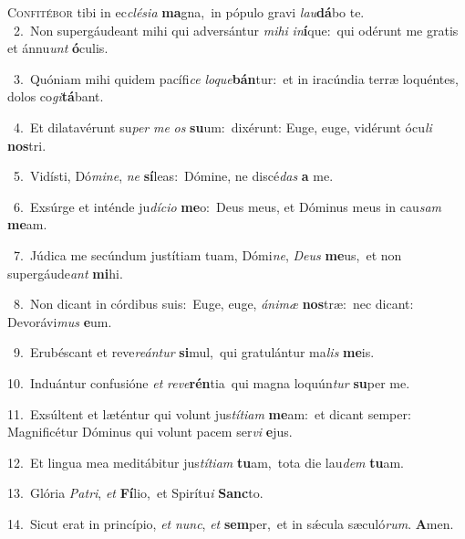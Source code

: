 \lettrine{\initial\textcolor{\initialcolor}{C}}{onfitébor} tibi in ec\-\textit{clé}\-\textit{si}\textit{a} \textbf{ma}\-gna,~\star in pópulo gravi \textit{lau}\-\textbf{dá}bo te.\\
{\numbfont\textcolor{\numbcolor}{~2.}}~Non supergáudeant mihi qui adversántur \textit{mi}\-\textit{hi} \textit{in}\-\textbf{í}que:~\star qui odérunt me gratis et ánnu\textit{unt} \textbf{ó}\-culis.\par
{\numbfont\textcolor{\numbcolor}{~3.}}~Quóniam mihi quidem pacífi\textit{ce} \textit{lo}\-\textit{que}\textbf{bán}tur:~\star et in iracúndia terræ loquéntes, dolos co\-\textit{gi}\-\textbf{tá}bant.\par
{\numbfont\textcolor{\numbcolor}{~4.}}~Et dilatavérunt su\textit{per} \textit{me} \textit{os} \textbf{su}\-um:~\star dixérunt: Euge, euge, vidérunt ócu\textit{li} \textbf{nos}\-tri.\par
{\numbfont\textcolor{\numbcolor}{~5.}}~Vidísti, Dó\-\textit{mi}\-\textit{ne}, \textit{ne} \textbf{sí}\-leas:~\star Dómine, ne discé\textit{das} \textbf{a} me.\par
{\numbfont\textcolor{\numbcolor}{~6.}}~Exsúrge et inténde ju\-\textit{dí}\-\textit{ci}\textit{o} \textbf{me}\-o:~\star Deus meus, et Dóminus meus in cau\textit{sam} \textbf{me}\-am.\par
{\numbfont\textcolor{\numbcolor}{~7.}}~Júdica me secúndum justítiam tuam, Dómi\-\textit{ne}\-, \textit{De}\-\textit{us} \textbf{me}\-us,~\star et non supergáude\textit{ant} \textbf{mi}\-hi.\par
{\numbfont\textcolor{\numbcolor}{~8.}}~Non dicant in córdibus suis:~\dagger Euge, euge, \textit{á}\-\textit{ni}\textit{mæ} \textbf{nos}\-træ:~\star nec dicant: Devorávi\textit{mus} \textbf{e}\-um.\par
{\numbfont\textcolor{\numbcolor}{~9.}}~Erubéscant et reve\-\textit{re}\-\textit{án}\textit{tur} \textbf{si}\-mul,~\star qui gratulántur ma\textit{lis} \textbf{me}\-is.\par
{\numbfont\textcolor{\numbcolor}{10.}}~Induántur confusióne \textit{et} \textit{re}\-\textit{ve}\textbf{rén}tia~\star qui magna loquún\textit{tur} \textbf{su}\-per me.\par
{\numbfont\textcolor{\numbcolor}{11.}}~Exsúltent et læténtur qui volunt jus\-\textit{tí}\-\textit{ti}\textit{am} \textbf{me}\-am:~\star et dicant semper: Magnificétur Dóminus qui volunt pacem ser\textit{vi} \textbf{e}\-jus.\par
{\numbfont\textcolor{\numbcolor}{12.}}~Et lingua mea meditábitur jus\-\textit{tí}\-\textit{ti}\textit{am} \textbf{tu}\-am,~\star tota die lau\textit{dem} \textbf{tu}\-am.\par
{\numbfont\textcolor{\numbcolor}{13.}}~Glória \textit{Pa}\-\textit{tri}, \textit{et} \textbf{Fí}\-lio,~\star et Spirítu\textit{i} \textbf{Sanc}\-to.\par
{\numbfont\textcolor{\numbcolor}{14.}}~Sicut erat in princípio, \textit{et} \textit{nunc}\-, \textit{et} \textbf{sem}\-per,~\star et in sǽcula sæculó\-\textit{rum}\-. \textbf{A}\-men.\par
